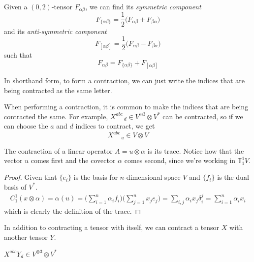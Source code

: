\documentclass{article}
\begin{document}
    \begin{definition}
    Given a $(0, 2)$-tensor $F_{\alpha \beta}$, we can find its \textit{symmetric component}
    \[ F_{ \{ \alpha \beta\}} = \frac{1}{2} \big(F_{\alpha \beta} + F_{\beta \alpha} \big)\]
    and its \textit{anti-symmetric component}
    \[ F_{ [ \alpha \beta]} = \frac{1}{2} \big(F_{\alpha \beta} - F_{\beta \alpha} \big)\]
    such that 
    \[ F_{\alpha \beta} = F_{ \{ \alpha \beta \}} + F_{[\alpha \beta]}\]
    \end{definition}

    In shorthand form, to form a contraction, we can just write the indices that are being contracted as the same letter. 

    \begin{example}
    When performing a contraction, it is common to make the indices that are being contracted the same. For example, $X^{a b c}_{\;\;\;\;\;\; d} \in V^{\otimes 3} \otimes V^*$ can be contracted, so if we can choose the $a$ and $d$ indices to contract, we get 
    \[X^{a b c}_{\;\;\;\;\;\; a} \in V \otimes V\]
    \end{example}

    \begin{proposition}
    The contraction of a linear operator $A = u \otimes \alpha$ is its trace. Notice how that the vector $u$ comes first and the covector $\alpha$ comes second, since we're working in $\mathbb{T}^1_1 V$. 
    \end{proposition}
    \begin{proof}
    Given that $\{e_i\}$ is the basis for $n$-dimensional space $V$ and $\{f_i\}$ is the dual basis of $V^*$.
    \begin{align*}
        C^1_1 (x \otimes \alpha) = \alpha (u) 
        = \Big( \sum_{i=1}^n \alpha_i f_i  \Big) \Big( \sum_{j=1}^n x_j e_j \Big)  = \sum_{i, j} \alpha_i x_j \delta^j_i = \sum_{i=1}^n \alpha_i x_i 
    \end{align*}
    which is clearly the definition of the trace. 
    \end{proof}

    In addition to contracting a tensor with itself, we can contract a tensor $X$ with another tensor $Y$. 

    \begin{example}
    $X^{a b c} Y_d \in V^{\otimes 3} \otimes V^*$ 
    \end{example}
\end{document}
